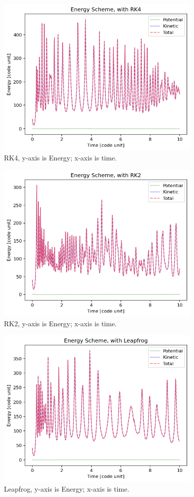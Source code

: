\documentclass[12pt]{article}
\begin{document}
    \begin{figure}[H]
        \centering 
        \includegraphics[width = 10cm]{./RK4/Energy.png}
        \caption{RK4, y-axis is Energy; x-axis is time.}
        \label{E1}
    \end{figure}

    \begin{figure}[H]
        \centering 
        \includegraphics[width = 10cm]{./RK2/Energy.png}
        \caption{RK2, y-axis is Energy; x-axis is time.}
        \label{E2}
    \end{figure}

    \begin{figure}[H]
        \centering 
        \includegraphics[width = 10cm]{./LF/Energy.png}
        \caption{Leapfrog, y-axis is Energy; x-axis is time.}
        \label{E3}
    \end{figure}
\end{document}
